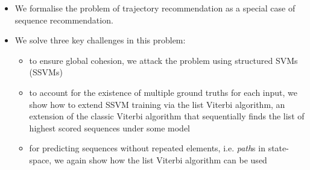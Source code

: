 \begin{itemize}[noitemsep,leftmargin=12pt]%
    \item We formalise the problem of trajectory recommendation as a special case of sequence recommendation.          



	\item We solve three key challenges in this problem:
	\begin{itemize}
		\item to ensure global cohesion, we attack the problem using structured SVMs (SSVMs)
		\item to account for the existence of multiple ground truths for each input, we show how
		to extend SSVM training via
		the list Viterbi algorithm, an extension of the classic Viterbi algorithm that sequentially finds the list of highest scored sequences under some model
		\item for predicting sequences without repeated elements, i.e. {\em path}s in state-space, we again show how the list Viterbi algorithm can be used
	\end{itemize}


\end{itemize}
